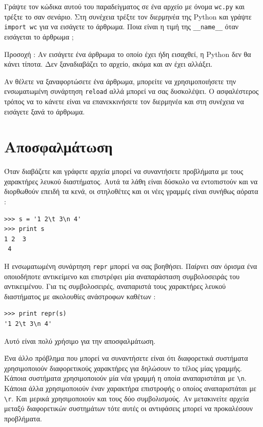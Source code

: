 \documentclass[10pt]{book}
\begin{document}
\begin{exercise}

Γράψτε τον κώδικα αυτού του παραδείγματος σε ένα αρχείο με όνομα  {\tt wc.py}  και τρέξτε το σαν σενάριο. Στη συνέχεια τρέξτε τον διερμηνέα της  Python  και γράψτε  {\tt import wc}  για να εισάγετε το άρθρωμα. Ποια είναι η τιμή της  \verb"__name__"  όταν εισάγεται το άρθρωμα ;

 Προσοχή :  Αν εισάγετε ένα άρθρωμα το οποίο έχει ήδη εισαχθεί, η  Python  δεν θα κάνει τίποτα. Δεν ξαναδιαβάζει το αρχείο, ακόμα και αν έχει αλλάξει.

Αν θέλετε να ξαναφορτώσετε ένα άρθρωμα, μπορείτε να χρησιμοποιήσετε την ενσωματωμένη συνάρτηση  {\tt reload}  αλλά μπορεί να σας δυσκολέψει. Ο ασφαλέστερος τρόπος να το κάνετε είναι να επανεκκινήσετε τον διερμηνέα και στη συνέχεια να εισάγετε ξανά το άρθρωμα. 
\end{exercise}



\section{Αποσφαλμάτωση}

Όταν διαβάζετε και γράφετε αρχεία μπορεί να συναντήσετε προβλήματα με τους χαρακτήρες λευκού διαστήματος. Αυτά τα λάθη είναι δύσκολο να εντοπιστούν και να διορθωθούν επειδή τα κενά, οι στηλοθέτες και οι νέες γραμμές είναι συνήθως αόρατα :

\begin{verbatim}
>>> s = '1 2\t 3\n 4'
>>> print s
1 2	 3
 4
\end{verbatim}

 Η ενσωματωμένη συνάρτηση  {\tt repr}  μπορεί να σας βοηθήσει. Παίρνει σαν όρισμα ένα οποιοδήποτε αντικείμενο και επιστρέφει μία αναπαράσταση συμβολοσειράς του αντικειμένου. Για τις συμβολοσειρές, αναπαριστά τους χαρακτήρες λευκού διαστήματος με ακολουθίες ανάστροφων καθέτων :

\begin{verbatim}
>>> print repr(s)
'1 2\t 3\n 4'
\end{verbatim}

 Αυτό είναι πολύ χρήσιμο για την αποσφαλμάτωση.

Ένα άλλο πρόβλημα που μπορεί να συναντήσετε είναι ότι διαφορετικά συστήματα χρησιμοποιούν διαφορετικούς χαρακτήρες για δηλώσουν το τέλος μίας γραμμής. Κάποια συστήματα χρησιμοποιούν 
μία νέα γραμμή η οποία αναπαριστάται με  \verb"\n".  Κάποια άλλα χρησιμοποιούν έναν χαρακτήρα επιστροφής ο οποίος αναπαριστάται με  \verb"\r".  Και μερικά χρησιμοποιούν και τους δύο συμβολισμούς. Αν μετακινείτε αρχεία μεταξύ διαφορετικών συστημάτων τότε αυτές οι αντιφάσεις μπορεί να προκαλέσουν προβλήματα.
\end{document}
